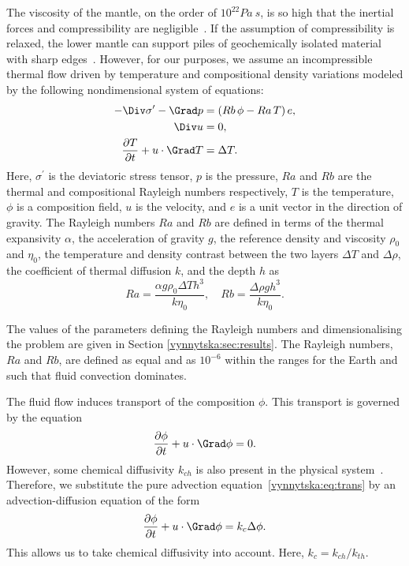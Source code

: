 The viscosity of the mantle, on the order of $10^{22}Pa~s$, is so high
that the inertial forces and compressibility are
negligible~\citep{Ricard2009}. If the assumption of compressibility is
relaxed, the lower mantle can support piles of geochemically isolated
material with sharp edges~\citep{TanGurnis2005}. However, for our
purposes, we assume an incompressible thermal flow driven by
temperature and compositional density variations modeled by the
following nondimensional system of equations:
\begin{align}
  \label{vynnytska:eq:momentum}
  - \Div \sigma^{\prime} - \Grad p
  &=  \left( Rb \, \phi - Ra \, T \right) e,\\
  \label{vynnytska:eq:incompress}
  \Div u & =  0,\\
  \label{vynnytska:eq:energy}
  \frac{\partial T}{\partial t} + u \cdot \Grad T & =  \Delta T.
\end{align}
Here, $\sigma^{\prime}$ is the deviatoric stress tensor, $p$ is the
pressure, $Ra$ and $Rb$ are the thermal and compositional Rayleigh
numbers respectively, $T$ is the temperature, $\phi$ is a
composition field, $u$ is the velocity, and $e$ is a unit vector in
the direction of gravity. The Rayleigh numbers
$Ra$ and $Rb$ are defined in terms of the thermal expansivity
$\alpha$, the acceleration of gravity $g$, the reference density and
viscosity $\rho_0$ and $\eta_0$, the temperature and density contrast
between the two layers $\Delta T$ and $\Delta \rho$, the coefficient
of thermal diffusion $k$, and the depth $h$ as
\begin{equation}
  Ra = \frac{\alpha g \rho_0 \Delta T h^3}{k \eta_0},  \quad
  Rb = \frac{\Delta \rho g h^3}{k \eta_0}.
\end{equation}

The values of the parameters defining the Rayleigh numbers and
dimensionalising the problem are given in
Section \ref{vynnytska:sec:results}. The Rayleigh numbers, $Ra$ and
$Rb$, are defined as equal and as $10^{-6}$ within the ranges for the
Earth \citep{MontagueKelloggManga1998} and such that fluid convection
dominates.

The fluid flow induces transport of the composition
$\phi$. This transport is governed by the equation
\begin{equation}
  \label{vynnytska:eq:trans}
  \frac{\partial \phi}{\partial t} +  u \cdot \Grad \phi = 0.
\end{equation}
However, some chemical diffusivity $k_{ch}$ is also present in the physical
system~\citep{KekenEtAl1997, HansenYuen1988}. Therefore, we substitute
the pure advection equation~\eqref{vynnytska:eq:trans} by an
advection-diffusion equation of the form
\begin{equation}
  \label{vynnytska:eq:transdif}
  \frac{\partial \phi}{\partial t}
  + u  \cdot \Grad \phi =  k_c \Delta \phi .
\end{equation}
This allows us to take chemical diffusivity into account. Here, $k_c =
k_{ch}/k_{th}$.

